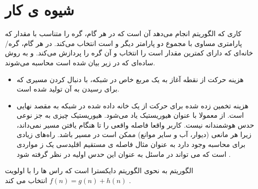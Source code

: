 \section{شیوه ی کار}
کاری که الگوریتم  انجام می‌دهد آن است که در هر گام، گره را متناسب با مقدار 
که پارامتری مساوی با مجموع دو پارامتر دیگر  و  است انتخاب می‌کند. در هر گام، گره/خانه‌ای که دارای کمترین مقدار است را انتخاب و آن گره را پردازش می‌کند.  و  به روش ساده‌ای که در زیر بیان شده است محاسبه می‌شوند.
\begin{itemize}
	\item{}
	 هزینه حرکت از نقطه آغاز به یک مربع خاص در شبکه، با دنبال کردن مسیری که برای رسیدن به آن تولید شده است.
		\item{}
		 هزینه تخمین زده شده برای حرکت از یک خانه داده شده در شبکه به مقصد نهایی است. از  معمولا با عنوان هیوریستیک یاد می‌شود. هیوریستیک چیزی به جز نوعی حدس هوشمندانه نیست. کاربر واقعا فاصله واقعی را تا هنگام یافتن مسیر نمی‌داند، زیرا هر مانعی (دیوار، آب و سایر موانع) ممکن است در مسیر باشد. راه‌های زیادی برای محاسبه  وجود دارد به عنوان مثال فاصله ی مستقیم اقلیدسی یک ز مواردی است که می تواند در ماسئل به عنوان این حدس اولیه در نظر گرفته شود .

\end{itemize}
الگوریتم 
به نحوی الگوریتم دایکسترا است که راس ها را با اولویت 
$f(n)=g(n)+h(n)$
انتخاب می کند .

